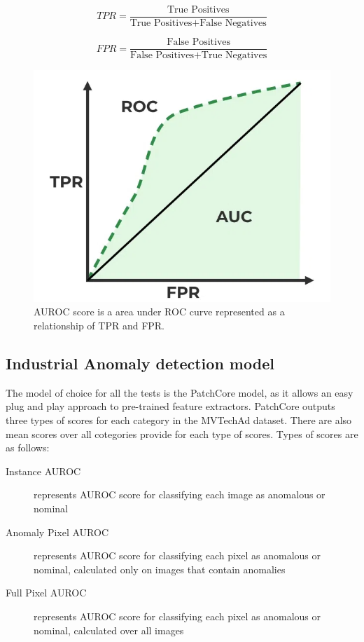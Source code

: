 \begin{equation}
	TPR = \frac{\text{True Positives}}{\text{True Positives} + \text{False Negatives}}
	\label{eq:tpr}
\end{equation}

\begin{equation}
	FPR = \frac{\text{False Positives}}{\text{False Positives} + \text{True Negatives}}
	\label{eq:fpr}
\end{equation}

\begin{figure}[h]
	\begin{center}
		\includegraphics[width=0.5\linewidth]{Chapter_4/auroc.png}
	\end{center}
	\caption{AUROC score is a area under ROC curve represented as a relationship of TPR and FPR.}
	\label{fig:auroc}
\end{figure}

\subsection{Industrial Anomaly detection model}
The model of choice for all the tests is the PatchCore model, as it allows an easy plug and play approach to pre-trained feature extractors. PatchCore outputs three types of scores for each category in the MVTechAd dataset. There are also mean scores over all cotegories provide for each type of scores. Types of scores are as follows:

\begin{description}
  \item[Instance AUROC] represents AUROC score for classifying each image as anomalous or nominal
  \item[Anomaly Pixel AUROC] represents AUROC score for classifying each pixel as anomalous or nominal, calculated only on images that contain anomalies
  \item[Full Pixel AUROC] represents AUROC score for classifying each pixel as anomalous or nominal, calculated over all images
\end{description}

